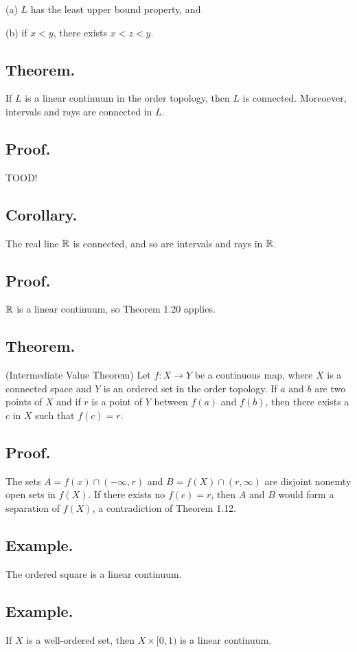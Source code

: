 \documentclass[titlepage]{article}
\begin{document}
(a) $L$ has the least upper bound property, and 

(b) if $x < y$, there exists $x < z < y$.

\subsection{Theorem.} If $L$ is a linear continuum in the order topology, then $L$ is connected. Moreoever, intervals and rays are connected in $L$.

\subsection{Proof.} TOOD!

\subsection{Corollary.} The real line $\mathbb{R}$ is connected, and so are intervals and rays in $\mathbb{R}$.

\subsection{Proof.} $\mathbb{R}$ is a linear continuum, so Theorem 1.20 applies.

\subsection{Theorem.} (Intermediate Value Theorem) Let $f: X \to Y$ be a continuous map, where $X$ is a connected space and $Y$ is an ordered set in the order topology. If $a$ and $b$ are two points of $X$ and if $r$ is a point of $Y$ between $f(a)$ and $f(b)$, then there exists a $c$ in $X$ such that $f(c) = r$.

\subsection{Proof.} The sets $A = f(x) \cap (-\infty, r)$ and $B = f(X) \cap (r, \infty)$ are disjoint nonemty open sets in $f(X)$. If there exists no $f(c) = r$, then $A$ and $B$ would form a separation of $f(X)$, a contradiction of Theorem 1.12.

\subsection{Example.} The ordered square is a linear continuum.

\subsection{Example.} If $X$ is a well-ordered set, then $X \times [0, 1)$ is a linear continuum.
\end{document}
